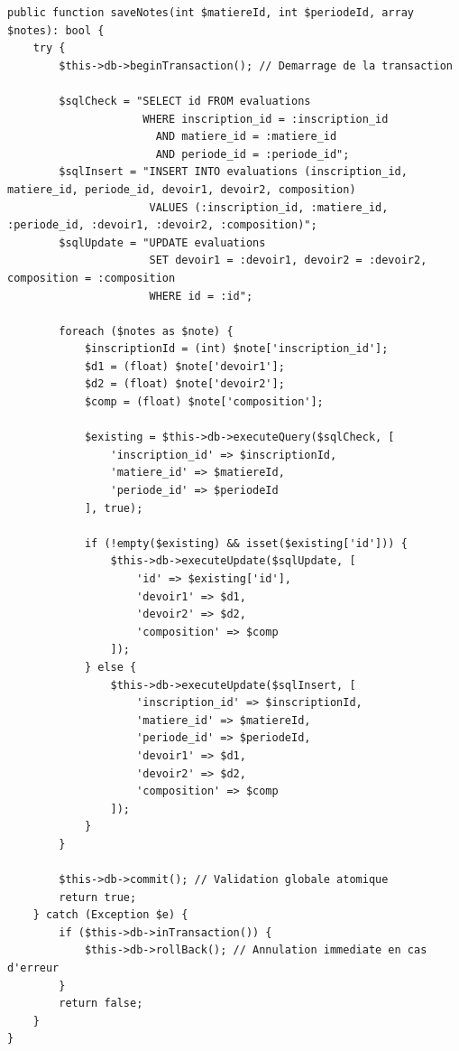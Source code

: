 \documentclass[11pt,a4paper,oneside]{report}
\begin{document}
\begin{lstlisting}[language=PHP8, caption={Implémentation de l'atomicité transactionnelle dans EvaluationModel}]
public function saveNotes(int $matiereId, int $periodeId, array $notes): bool {
    try {
        $this->db->beginTransaction(); // Demarrage de la transaction

        $sqlCheck = "SELECT id FROM evaluations 
                     WHERE inscription_id = :inscription_id 
                       AND matiere_id = :matiere_id 
                       AND periode_id = :periode_id";
        $sqlInsert = "INSERT INTO evaluations (inscription_id, matiere_id, periode_id, devoir1, devoir2, composition) 
                      VALUES (:inscription_id, :matiere_id, :periode_id, :devoir1, :devoir2, :composition)";
        $sqlUpdate = "UPDATE evaluations 
                      SET devoir1 = :devoir1, devoir2 = :devoir2, composition = :composition 
                      WHERE id = :id";

        foreach ($notes as $note) {
            $inscriptionId = (int) $note['inscription_id'];
            $d1 = (float) $note['devoir1'];
            $d2 = (float) $note['devoir2'];
            $comp = (float) $note['composition'];

            $existing = $this->db->executeQuery($sqlCheck, [
                'inscription_id' => $inscriptionId,
                'matiere_id' => $matiereId,
                'periode_id' => $periodeId
            ], true);

            if (!empty($existing) && isset($existing['id'])) {
                $this->db->executeUpdate($sqlUpdate, [
                    'id' => $existing['id'],
                    'devoir1' => $d1,
                    'devoir2' => $d2,
                    'composition' => $comp
                ]);
            } else {
                $this->db->executeUpdate($sqlInsert, [
                    'inscription_id' => $inscriptionId,
                    'matiere_id' => $matiereId,
                    'periode_id' => $periodeId,
                    'devoir1' => $d1,
                    'devoir2' => $d2,
                    'composition' => $comp
                ]);
            }
        }

        $this->db->commit(); // Validation globale atomique
        return true;
    } catch (Exception $e) {
        if ($this->db->inTransaction()) {
            $this->db->rollBack(); // Annulation immediate en cas d'erreur
        }
        return false;
    }
}
\end{lstlisting}
\end{document}
